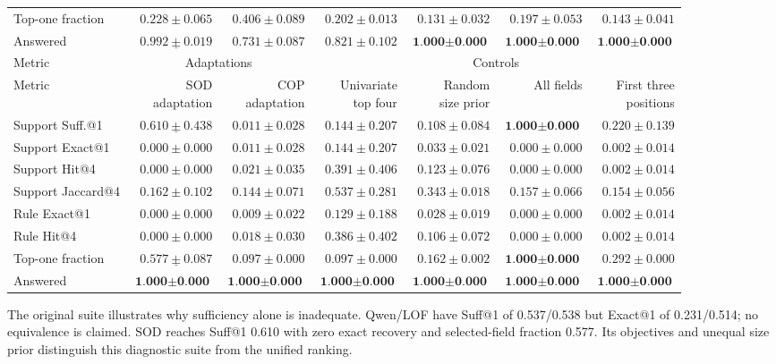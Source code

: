 \documentclass[conference]{IEEEtran}
\begin{document}
\begin{table}[t]
\begin{tabular}{|l|rrrrrr|}
Top-one fraction & $0.228\pm0.065$ & $0.406\pm0.089$ & $0.202\pm0.013$ & $0.131\pm0.032$ & $0.197\pm0.053$ & $0.143\pm0.041$ \\
Answered & $\underline{0.992\pm0.019}$ & $0.731\pm0.087$ & $0.821\pm0.102$ & $\textbf{1.000}\pm\textbf{0.000}$ & $\textbf{1.000}\pm\textbf{0.000}$ & $\textbf{1.000}\pm\textbf{0.000}$ \\
\hline
Metric & \multicolumn{2}{c|}{Adaptations} & \multicolumn{4}{c|}{Controls} \\
\hline
Metric & \shortstack{SOD\\adaptation} & \shortstack{COP\\adaptation} & \shortstack{Univariate\\top four} & \shortstack{Random\\size prior} & All fields & \shortstack{First three\\positions} \\
\hline
Support Suff.@1 & $\underline{0.610\pm0.438}$ & $0.011\pm0.028$ & $0.144\pm0.207$ & $0.108\pm0.084$ & $\textbf{1.000}\pm\textbf{0.000}$ & $0.220\pm0.139$ \\
Support Exact@1 & $0.000\pm0.000$ & $0.011\pm0.028$ & $0.144\pm0.207$ & $0.033\pm0.021$ & $0.000\pm0.000$ & $0.002\pm0.014$ \\
Support Hit@4 & $0.000\pm0.000$ & $0.021\pm0.035$ & $0.391\pm0.406$ & $0.123\pm0.076$ & $0.000\pm0.000$ & $0.002\pm0.014$ \\
Support Jaccard@4 & $0.162\pm0.102$ & $0.144\pm0.071$ & $0.537\pm0.281$ & $0.343\pm0.018$ & $0.157\pm0.066$ & $0.154\pm0.056$ \\
\hline
Rule Exact@1 & $0.000\pm0.000$ & $0.009\pm0.022$ & $0.129\pm0.188$ & $0.028\pm0.019$ & $0.000\pm0.000$ & $0.002\pm0.014$ \\
Rule Hit@4 & $0.000\pm0.000$ & $0.018\pm0.030$ & $0.386\pm0.402$ & $0.106\pm0.072$ & $0.000\pm0.000$ & $0.002\pm0.014$ \\
\hline
Top-one fraction & $\underline{0.577\pm0.087}$ & $0.097\pm0.000$ & $0.097\pm0.000$ & $0.162\pm0.002$ & $\textbf{1.000}\pm\textbf{0.000}$ & $0.292\pm0.000$ \\
Answered & $\textbf{1.000}\pm\textbf{0.000}$ & $\textbf{1.000}\pm\textbf{0.000}$ & $\textbf{1.000}\pm\textbf{0.000}$ & $\textbf{1.000}\pm\textbf{0.000}$ & $\textbf{1.000}\pm\textbf{0.000}$ & $\textbf{1.000}\pm\textbf{0.000}$ \\
\hline
\end{tabular}
\label{tab:original}
\end{table}
The original suite illustrates why sufficiency alone is inadequate. Qwen/LOF have Suff@1 of 0.537/0.538 but Exact@1 of 0.231/0.514; no equivalence is claimed. SOD reaches Suff@1 0.610 with zero exact recovery and selected-field fraction 0.577. Its objectives and unequal size prior distinguish this diagnostic suite from the unified ranking.
\end{document}
